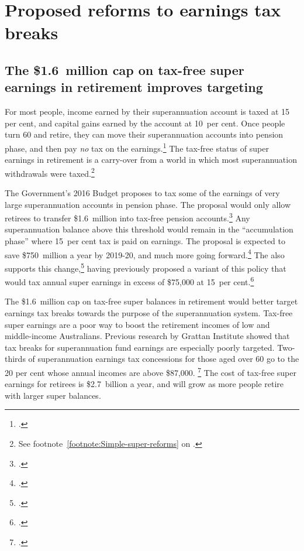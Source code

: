 \documentclass[continuous]{grattan}\usepackage[]{graphicx}\usepackage[]{color}
\begin{document}
\chapter{{Proposed reforms to earnings tax breaks}}\label{chap:proposed-reforms-to-earnings-tax-breaks}

\section{The \$1.6~million cap on tax-free super earnings in retirement improves targeting}\label{sec:the-1.6-million-cap-on-tax-free-super-earnings-in-retirement-improves-targeting}
For most people, income earned by their superannuation account is taxed at 15 per cent, and capital gains earned by the account at 10~per cent. 
Once people turn 60 and retire, they can move their superannuation accounts into pension phase, and then pay \emph{no} tax on the earnings.\footcite[][13]{DaleyCoatesWoodEtAl2015Super} 
The tax-free status of super earnings in retirement is a carry-over from a world in which most superannuation withdrawals were taxed.\footnote{See footnote~\ref{footnote:Simple-super-reforms} on .}

The Government’s 2016 Budget proposes to tax some of the earnings of very large superannuation accounts in pension phase. 
The proposal would only allow retirees to transfer \$1.6~million into tax-free pension accounts.\footcite[][25]{BudgetPapers201617} %
Any superannuation balance above this threshold would remain in the “accumulation phase” where 15~per cent tax is paid on earnings. 
The proposal is expected to save \$750~million a year by 2019-20, and much more going forward.\footcite[][25]{BudgetPapers201617}
The \ALP{} also supports this change,\footcite{Bowen-2016-Labors-plan-for-super-not-retrospective}  having previously proposed a variant of this policy that would tax annual super earnings in excess of \$75,000 at 15~per cent.\footcite{ALP2015FairerSuper} 

The \$1.6~million cap on tax-free super balances in retirement would better target earnings tax breaks towards the purpose of the superannuation system.
Tax-free super earnings are a poor way to boost the retirement incomes of low and middle-income Australians.
Previous research by Grattan Institute showed that tax breaks for superannuation fund earnings are especially poorly targeted.
Two-thirds of superannuation earnings tax concessions for those aged over 60 go to the 20 per cent whose annual incomes are above \$87,000.%
\footcite[][60]{DaleyCoatesWoodEtAl2015Super} %
The cost of tax-free super earnings for retirees is \$2.7~billion a year, and will grow as more people retire with larger super balances.
\end{document}

